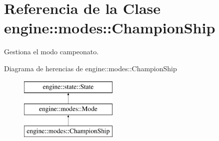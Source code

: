 \hypertarget{classengine_1_1modes_1_1ChampionShip}{
\section{\-Referencia de la \-Clase engine\-:\-:modes\-:\-:\-Champion\-Ship}
\label{classengine_1_1modes_1_1ChampionShip}
}


\-Gestiona el modo campeonato.  


\-Diagrama de herencias de engine\-:\-:modes\-:\-:\-Champion\-Ship\begin{figure}[H]
\begin{center}
\leavevmode
\includegraphics[height=3.000000cm]{classengine_1_1modes_1_1ChampionShip}
\end{center}
\end{figure}
